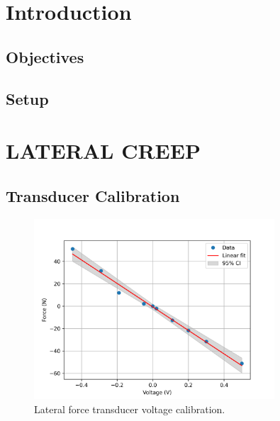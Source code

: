\documentclass{article}
\begin{document}
\title{}
\author{lwp26}
\date{November 2024}
\maketitle 

\section{Introduction}

\subsection{Objectives}

\subsection{Setup}

\section{LATERAL CREEP}

\subsection{\textbf{Transducer Calibration}}

\begin{figure}[H]
    \centering
    \includegraphics[width=0.8\textwidth]{Calibration/linearity.png}
    \caption{Lateral force transducer voltage calibration.}
    \label{fig:force_linearity}
\end{figure}
\end{document}
